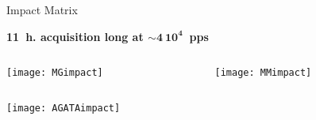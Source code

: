 \documentclass[10pt]{beamer}
\begin{document}
\begin{frame}{Impact Matrix}
    	\vspace{-0.05\textheight}
    \begin{overlayarea}{\textwidth}{0.1\textheight}
	\centering
	\textbf{11~h. acquisition long at $\mathbf{\sim 4\ 10^{4}}$~pps}
	\end{overlayarea}
	\begin{columns}
		\begin{column}{0.5\textwidth}
			\begin{overlayarea}{\textwidth}{0.5\textheight}
				\centering
				\texttt{[image: MGimpact]}
			\end{overlayarea}
		\end{column}
		\begin{column}{0.5\textwidth}
			\begin{overlayarea}{\textwidth}{0.5\textheight}
				\centering       
				\texttt{[image: MMimpact]}\\
		    \end{overlayarea}	
		\end{column}
	\end{columns}
	\centering       
	\texttt{[image: AGATAimpact]}\\
\end{frame}
\end{document}
